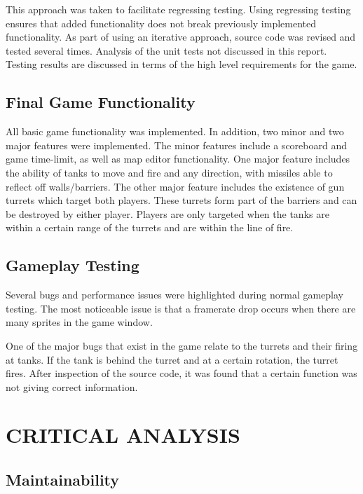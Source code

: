 \documentclass[10pt,twocolumn]{witseiepaper}
\begin{document}
This approach was taken to facilitate regressing testing. Using regressing testing ensures that added functionality does not break previously implemented functionality. As part of using an iterative approach, source code was revised and tested several times. Analysis of the unit tests not discussed in this report. Testing results are discussed in terms of the high level requirements for the game.

\subsection{Final Game Functionality}
All basic game functionality was implemented. In addition, two minor and two major features were implemented. The minor features include a scoreboard and game time-limit, as well as map editor functionality. One major feature includes the ability of tanks to move and fire and any direction, with missiles able to reflect off walls/barriers. The other major feature includes the existence of gun turrets which target both players. These turrets form part of the barriers and can be destroyed by either player. Players are only targeted when the tanks are within a certain range of the turrets and are within the line of fire.

\subsection{Gameplay Testing}
Several bugs and performance issues were highlighted during normal gameplay testing. The most noticeable issue is that a framerate drop occurs when there are many sprites in the game window. 

One of the major bugs that exist in the game relate to the turrets and their firing at tanks. If the tank is behind the turret and at a certain rotation, the turret fires. After inspection of the source code, it was found that a certain function was not giving correct information. %


%
\section{CRITICAL ANALYSIS} %

\subsection{Maintainability}
\end{document}
